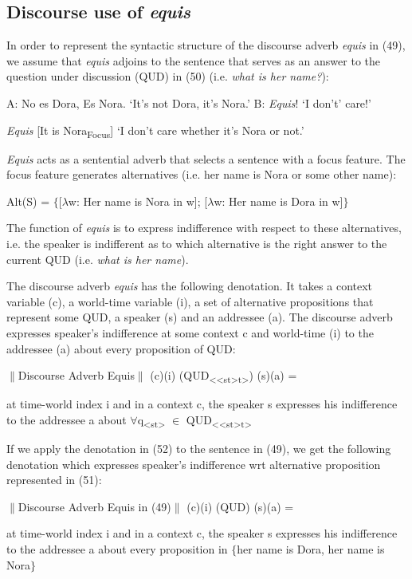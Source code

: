 \documentclass[output=paper
,modfonts
,nonflat]{langsci/langscibook}
\begin{document}
\subsection{Discourse use of \textit{equis}}\label{sec:kellert:3.4}
In order to represent the syntactic structure of the discourse adverb \textit{equis} in (49), we assume that \textit{equis} adjoins to the sentence that serves as an answer to the question under discussion (QUD) in (50) (i.e. \textit{what is her name?}):

\ea A: No es Dora, Es Nora. `It’s not Dora, it’s Nora.' B: \textit{Equis}! ‘I don’t’ care!’
\z

\ea \textit{Equis} {[}It is Nora\textsubscript{Focus}{]} ‘I don’t care whether it’s Nora or not.’
\z

\textit{Equis} acts as a sentential adverb that selects a sentence with a focus feature. The focus feature generates alternatives (i.e. her name is Nora or some other name):

\ea Alt(S) = $\lbrace${[}$\lambda$w: Her name is Nora in w{]}; {[}$\lambda$w: Her name is Dora in w{]}$\rbrace$
\z

The function of \textit{equis} is to express indifference with respect to these alternatives, i.e. the speaker is indifferent as to which alternative is the right answer to the current QUD (i.e. \textit{what is her name}). 

The discourse adverb \textit{equis} has the following denotation. It takes a context variable (c), a world-time variable (i), a set of alternative propositions that represent some QUD, a speaker (s) and an addressee (a). The discourse adverb expresses speaker’s indifference at some context c and world-time (i) to the addressee (a) about every proposition of QUD:

\ea $\parallel$Discourse Adverb Equis$\parallel$ (c)(i) (QUD\textsubscript{{<}{<}st>t>}) (s)(a) =\par at time-world index i and in a context c, the speaker s expresses his indifference to the addressee a about $\forall$q\textsubscript{<st>} $\in$ QUD\textsubscript{{<}{<}st>t>}
\z

If we apply the denotation in (52) to the sentence in (49), we get the following denotation which expresses speaker’s indifference wrt alternative proposition represented in (51):

\ea $\parallel$Discourse Adverb Equis in (49)$\parallel$ (c)(i) (QUD) (s)(a) =\par
at time-world index i and in a context c, the speaker s expresses his indifference to the addressee a about every proposition in $\lbrace$her name is Dora, her name is Nora$\rbrace$
\z
\end{document}
